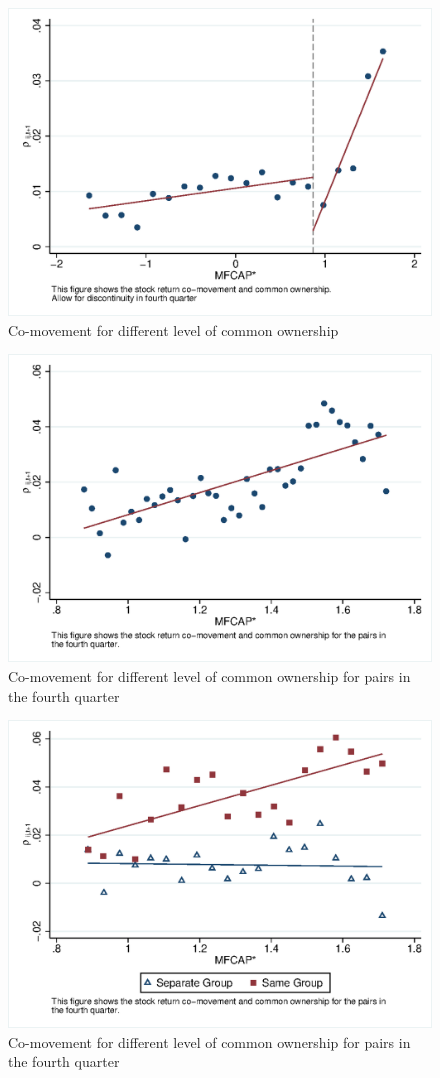 			\begin{figure}[htbp]
				\centering  
				\includegraphics[width=0.8\linewidth]{"Output/Qmcorr5lrd.eps"}
				\caption{ Co-movement for different level of common ownership}
				\label{Qmcorr5lrd}
			\end{figure}
						\begin{figure}[htbp]
							\centering 
							\includegraphics[width=0.8\linewidth]{"Output/Qmcorr5subsample.eps"}
							\caption{Co-movement for different level of common ownership for pairs in the fourth quarter}
							\label{Qmcorr5subsample}
						\end{figure}
			\begin{figure}[htbp]
				\centering  
				\includegraphics[width=0.8\linewidth]{"Output/Qmcorr5lrdbgsubsample.eps"}
				\caption{Co-movement for different level of common ownership for pairs in the fourth quarter}
				\label{Qmcorr5subsamplebg}
			\end{figure}
			
